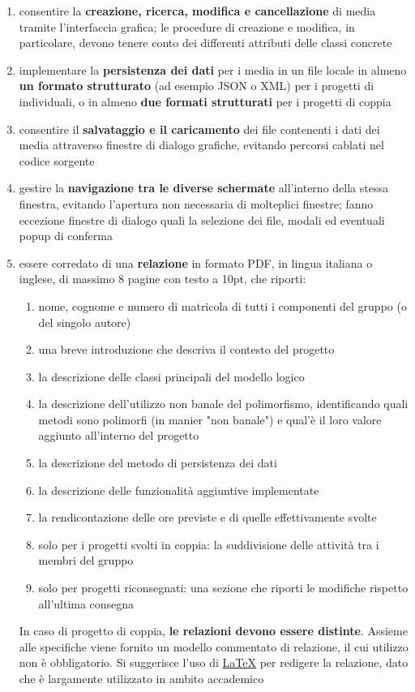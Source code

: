 \documentclass[10pt,a4paper,oneside]{article}
\begin{document}
\begin{enumerate}
 \item consentire la \textbf{creazione, ricerca, modifica e cancellazione} di media tramite l'interfaccia grafica; le procedure di creazione e modifica, in particolare, devono tenere conto dei differenti attributi delle classi concrete
 \item implementare la \textbf{persistenza dei dati} per i media in un file locale in almeno \textbf{un formato strutturato} (ad esempio JSON o XML) per i progetti di individuali, o in almeno \textbf{due formati strutturati} per i progetti di coppia
 \item consentire il \textbf{salvataggio e il caricamento} dei file contenenti i dati dei media attraverso finestre di dialogo grafiche, evitando percorsi cablati nel codice sorgente
 \item gestire la \textbf{navigazione tra le diverse schermate} all'interno della stessa finestra, evitando l'apertura non necessaria di molteplici finestre; fanno eccezione finestre di dialogo quali la selezione dei file, modali ed eventuali popup di conferma
 \item essere corredato di una \textbf{relazione} in formato PDF, in lingua italiana o inglese, di massimo 8 pagine con testo a 10pt, che riporti:
 \begin{enumerate}
  \item nome, cognome e numero di matricola di tutti i componenti del gruppo (o del singolo autore)
  \item una breve introduzione che descriva il contesto del progetto
  \item la descrizione delle classi principali del modello logico
  \item la descrizione dell'utilizzo non banale del polimorfismo, identificando quali metodi sono polimorfi (in manier "non banale") e qual'è il loro valore aggiunto all'interno del progetto
  \item la descrizione del metodo di persistenza dei dati
  \item la descrizione delle funzionalità aggiuntive implementate
  \item la rendicontazione delle ore previste e di quelle effettivamente svolte
  \item solo per i progetti svolti in coppia: la suddivisione delle attività tra i membri del gruppo
  \item solo per progetti riconsegnati: una sezione che riporti le modifiche rispetto all'ultima consegna
 \end{enumerate}
 In caso di progetto di coppia, \textbf{le relazioni devono essere distinte}. Assieme alle specifiche viene fornito un modello commentato di relazione, il cui utilizzo non è obbligatorio. Si suggerisce l'uso di \href{https://it.wikipedia.org/wiki/LaTeX}{LaTeX} per redigere la relazione, dato che è largamente utilizzato in ambito accademico
\end{enumerate}
\end{document}
